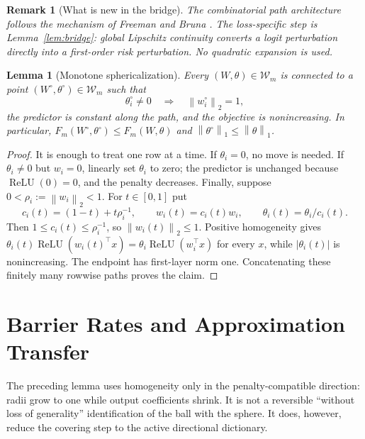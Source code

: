 \documentclass[pdflatex,sn-mathphys-num]{sn-jnl}
\theoremstyle{thmstyleone}
\newtheorem{lemma}[theorem]{Lemma}
\theoremstyle{thmstyletwo}
\newtheorem{remark}[theorem]{Remark}
\theoremstyle{thmstylethree}
\newcommand{\relu}{\operatorname{ReLU}}
\newcommand{\norm}[1]{\left\lVert #1 \right\rVert}
\newcommand{\abs}[1]{\left\lvert #1 \right\rvert}
\begin{document}
\begin{remark}[What is new in the bridge]\label{rem:novelty}
The combinatorial path architecture follows the mechanism of Freeman and Bruna \cite{FreemanBruna2017}. The loss-specific step is Lemma~\ref{lem:bridge}: global Lipschitz continuity converts a logit perturbation directly into a first-order risk perturbation. No quadratic expansion is used.
\end{remark}

\begin{lemma}[Monotone sphericalization]\label{lem:sphericalize}
Every $(W,\theta)\in\mathcal W_m$ is connected to a point $(W^\circ,\theta^\circ)\in\mathcal W_m$ such that
\begin{equation}
\theta_i^\circ\ne0
\quad\Longrightarrow\quad
\norm{w_i^\circ}_2=1,
\label{eq:spherical-active}
\end{equation}
the predictor is constant along the path, and the objective is nonincreasing. In particular,
$F_m(W^\circ,\theta^\circ)\le F_m(W,\theta)$ and
$\norm{\theta^\circ}_1\le\norm{\theta}_1$.
\end{lemma}

\begin{proof}
It is enough to treat one row at a time. If $\theta_i=0$, no move is needed. If $\theta_i\ne0$ but $w_i=0$, linearly set $\theta_i$ to zero; the predictor is unchanged because $\relu(0)=0$, and the penalty decreases. Finally, suppose $0<\rho_i:=\norm{w_i}_2<1$. For $t\in[0,1]$ put
\[
c_i(t)=(1-t)+t\rho_i^{-1},
\qquad
w_i(t)=c_i(t)w_i,
\qquad
\theta_i(t)=\theta_i/c_i(t).
\]
Then $1\le c_i(t)\le\rho_i^{-1}$, so $\norm{w_i(t)}_2\le1$. Positive homogeneity gives
$\theta_i(t)\relu(w_i(t)^\top x)=\theta_i\relu(w_i^\top x)$ for every $x$, while $\abs{\theta_i(t)}$ is nonincreasing. The endpoint has first-layer norm one. Concatenating these finitely many rowwise paths proves the claim.
\end{proof}

\section{Barrier Rates and Approximation Transfer}\label{sec:rates}

The preceding lemma uses homogeneity only in the penalty-compatible direction: radii grow to one while output coefficients shrink. It is not a reversible ``without loss of generality'' identification of the ball with the sphere. It does, however, reduce the covering step to the active directional dictionary.
\end{document}
